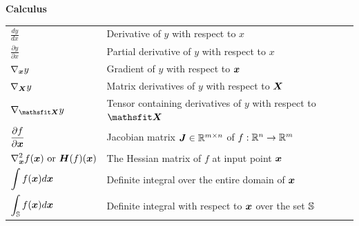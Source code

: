 \documentclass{article} %
\begin{document}
\centerline{\bf Calculus}
\bgroup
\def\arraystretch{1.5}
\begin{tabular}{p{1.25in}p{3.25in}}
   $\displaystyle\frac{d y} {d x}$                            & Derivative of $y$ with respect to $x$                                  \\ [2ex]
   $\displaystyle \frac{\partial y} {\partial x} $            & Partial derivative of $y$ with respect to $x$                          \\
   $\displaystyle \nabla_{\bm{x}} y $                              & Gradient of $y$ with respect to ${\bm{x}}$                                  \\
   $\displaystyle \nabla_{\bm{X}} y $                              & Matrix derivatives of $y$ with respect to ${\bm{X}}$                        \\
   $\displaystyle \nabla_\tX y $                              & Tensor containing derivatives of $y$ with respect to $\tX$             \\
   $\displaystyle \frac{\partial f}{\partial {\bm{x}}} $           & Jacobian matrix ${\bm{J}} \in \mathbb{R}^{m\times n}$ of $f: \mathbb{R}^n \rightarrow \mathbb{R}^m$ \\
   $\displaystyle \nabla_{\bm{x}}^2 f({\bm{x}})\text{ or }{\bm{H}}( f)({\bm{x}})$ & The Hessian matrix of $f$ at input point ${\bm{x}}$                         \\
   $\displaystyle \int f({\bm{x}}) d{\bm{x}} $                          & Definite integral over the entire domain of ${\bm{x}}$                      \\
   $\displaystyle \int_{\mathbb{S}} f({\bm{x}}) d{\bm{x}}$                       & Definite integral with respect to ${\bm{x}}$ over the set ${\mathbb{S}}$             \\
\end{tabular}
\egroup
\vspace{0.25cm}
\end{document}

